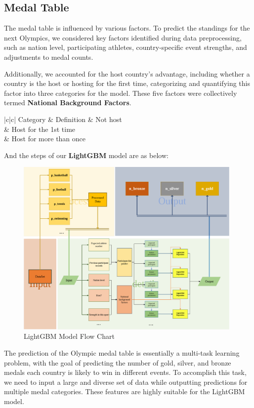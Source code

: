 \documentclass[12pt]{article}  %
\begin{document}
\subsection{Medal Table}
The medal table is influenced by various factors. To predict the standings for the next Olympics, we considered key factors identified during data preprocessing, such as nation level, participating athletes, country-specific event strengths, and adjustments to medal counts.

Additionally, we accounted for the host country's advantage, including whether a country is the host or hosting for the first time, categorizing and quantifying this factor into three categories for the model. These five factors were collectively termed \textbf{National Background Factors}.



\begin{longtable}{|c|c|} 
	\hline
	Category & Definition               \endfirsthead 
	        & Not host                 \\ 
	        & Host for the 1st time    \\ 
	        & Host for more than once  \\
	\hline
\end{longtable}


And the steps of our \textbf{LightGBM} model are as below:
\begin{figure}[H]
	\centering
	\includegraphics[width=11cm]{img/xiao.png}
	\caption{LightGBM Model Flow Chart}
	\label{fig:aa}
\end{figure}
The prediction of the Olympic medal table is essentially a multi-task learning problem, with the goal of predicting the number of gold, silver, and bronze medals each country is likely to win in different events. To accomplish this task, we need to input a large and diverse set of data while outputting predictions for multiple medal categories. These features are highly suitable for the LightGBM model.
\end{document}
